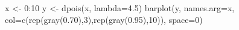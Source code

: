 \begin{Schunk}
\begin{Sinput}
 x <- 0:10
 y <- dpois(x, lambda=4.5)
 barplot(y, names.arg=x, col=c(rep(gray(0.70),3),rep(gray(0.95),10)), space=0)
\end{Sinput}
\end{Schunk}
